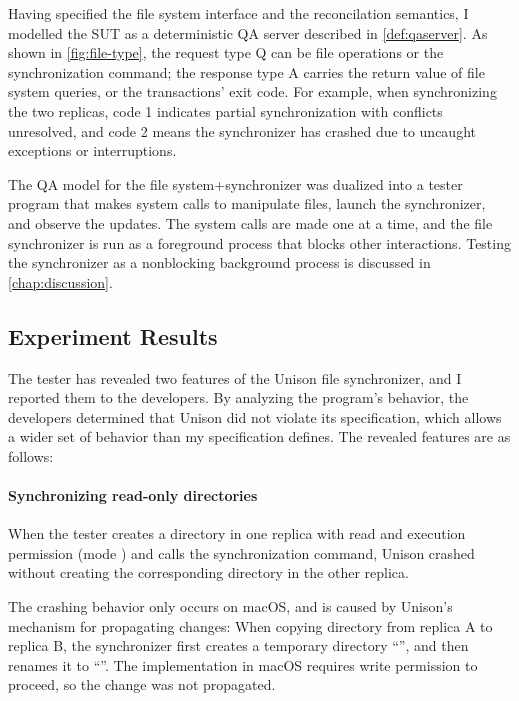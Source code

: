 Having specified the file system interface and the reconcilation semantics, I
modelled the SUT as a deterministic QA server described in
\autoref{def:qaserver}.  As shown in \autoref{fig:file-type}, the request type
\ilc Q can be file operations or the synchronization command; the response type
\ilc A carries the return value of file system queries, or the transactions'
exit code.  For example, when synchronizing the two replicas, code 1 indicates
partial synchronization with conflicts unresolved, and code 2 means the
synchronizer has crashed due to uncaught exceptions or interruptions.

The QA model for the file system+synchronizer was dualized into a tester program
that makes system calls to manipulate files, launch the synchronizer, and
observe the updates.  The system calls are made one at a time, and the file
synchronizer is run as a foreground process that blocks other interactions.
Testing the synchronizer as a nonblocking background process is discussed in
\autoref{chap:discussion}.

\subsection{Experiment Results}
\label{sec:file-result}
The tester has revealed two features of the Unison file synchronizer, and I
reported them to the developers.  By analyzing the program's behavior, the
developers determined that Unison did not violate its specification, which
allows a wider set of behavior than my specification defines.  The revealed
features are as follows:

\paragraph{Synchronizing read-only directories}
When the tester creates a directory in one replica with read and execution
permission (mode ) and calls the synchronization command, Unison
crashed without creating the corresponding directory in the other replica.

The crashing behavior only occurs on macOS, and is caused by Unison's mechanism
for propagating changes: When copying directory  from replica \ilj A to
replica \ilj B, the synchronizer first creates a temporary directory
``'', and then renames it to ``''.
The  implementation in macOS requires write permission to
proceed, so the change was not propagated.

